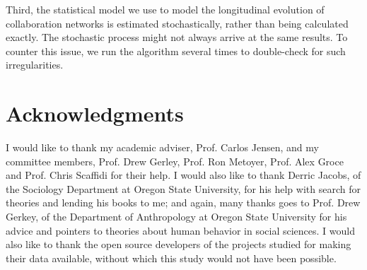 \documentclass[12pt]{report}
\begin{document}
Third, the statistical model we use to model the longitudinal evolution of collaboration networks is estimated stochastically, rather than being calculated exactly. The stochastic process might not always arrive at the same results. To counter this issue, we run the algorithm several times to double-check for such irregularities.


\section*{Acknowledgments}
\label{acknowledgments}
I would like to thank my academic adviser, Prof. Carlos Jensen, and my committee members, Prof. Drew Gerley, Prof. Ron Metoyer, Prof. Alex Groce and Prof. Chris Scaffidi for their help. I would also like to thank Derric Jacobs, of the Sociology Department at Oregon State University, for his help with search for theories and lending his books to me; and again, many thanks goes to Prof. Drew Gerkey, of the Department of Anthropology at Oregon State University for his advice and pointers to theories about human behavior in social sciences. I would also like to thank the open source developers of the projects studied for making their data available, without which this study would not have been possible. \\


%

\pagebreak
\end{document}
